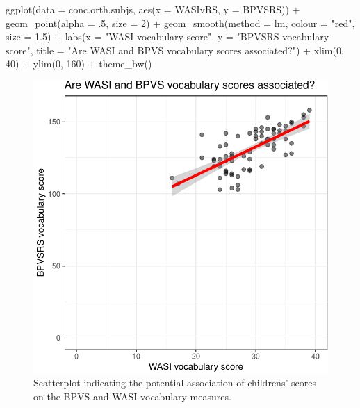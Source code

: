 \documentclass[
  letterpaper,
  DIV=11,
  numbers=noendperiod]{scrreprt}
\newenvironment{Shaded}{\begin{snugshade}}{\end{snugshade}}
\newcommand{\AttributeTok}[1]{\textcolor[rgb]{0.40,0.45,0.13}{#1}}
\newcommand{\DecValTok}[1]{\textcolor[rgb]{0.68,0.00,0.00}{#1}}
\newcommand{\FloatTok}[1]{\textcolor[rgb]{0.68,0.00,0.00}{#1}}
\newcommand{\FunctionTok}[1]{\textcolor[rgb]{0.28,0.35,0.67}{#1}}
\newcommand{\NormalTok}[1]{\textcolor[rgb]{0.00,0.23,0.31}{#1}}
\newcommand{\SpecialCharTok}[1]{\textcolor[rgb]{0.37,0.37,0.37}{#1}}
\newcommand{\StringTok}[1]{\textcolor[rgb]{0.13,0.47,0.30}{#1}}
\begin{document}
\begin{Shaded}
\begin{Highlighting}[numbers=left,,]
\FunctionTok{ggplot}\NormalTok{(}\AttributeTok{data =}\NormalTok{ conc.orth.subjs, }\FunctionTok{aes}\NormalTok{(}\AttributeTok{x =}\NormalTok{ WASIvRS, }\AttributeTok{y =}\NormalTok{ BPVSRS)) }\SpecialCharTok{+}
  \FunctionTok{geom\_point}\NormalTok{(}\AttributeTok{alpha =}\NormalTok{ .}\DecValTok{5}\NormalTok{, }\AttributeTok{size =} \DecValTok{2}\NormalTok{) }\SpecialCharTok{+}
  \FunctionTok{geom\_smooth}\NormalTok{(}\AttributeTok{method =} \StringTok{\textquotesingle{}lm\textquotesingle{}}\NormalTok{, }\AttributeTok{colour =} \StringTok{"red"}\NormalTok{, }\AttributeTok{size =} \FloatTok{1.5}\NormalTok{) }\SpecialCharTok{+}
  \FunctionTok{labs}\NormalTok{(}\AttributeTok{x =} \StringTok{"WASI vocabulary score"}\NormalTok{, }
       \AttributeTok{y =} \StringTok{"BPVSRS vocabulary score"}\NormalTok{,}
       \AttributeTok{title =} \StringTok{"Are WASI and BPVS vocabulary scores associated?"}\NormalTok{) }\SpecialCharTok{+}
  \FunctionTok{xlim}\NormalTok{(}\DecValTok{0}\NormalTok{, }\DecValTok{40}\NormalTok{) }\SpecialCharTok{+} \FunctionTok{ylim}\NormalTok{(}\DecValTok{0}\NormalTok{, }\DecValTok{160}\NormalTok{) }\SpecialCharTok{+}
  \FunctionTok{theme\_bw}\NormalTok{()}
\end{Highlighting}
\end{Shaded}

\begin{figure}[H]

{\centering \includegraphics{visualization_files/figure-pdf/fig-scatter-BPVS-WASI-lm-edits-1.pdf}

}

\caption{\label{fig-scatter-BPVS-WASI-lm-edits}Scatterplot indicating
the potential association of childrens' scores on the BPVS and WASI
vocabulary measures.}

\end{figure}
\end{document}
